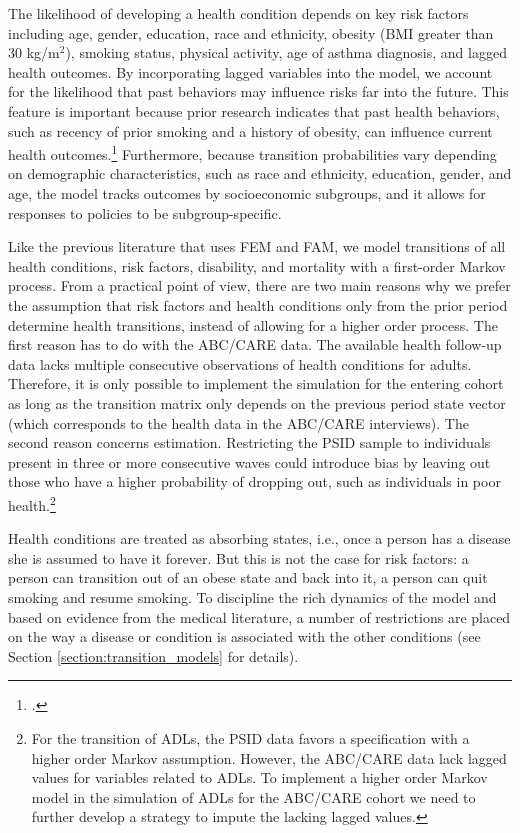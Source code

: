 \noindent The likelihood of developing a health condition depends on key risk factors including age, gender, education, race and ethnicity, obesity (BMI greater than 30 kg/m$^2$), smoking status, physical activity, age of asthma diagnosis, and lagged health outcomes. By incorporating lagged variables into the model, we account for the likelihood that past behaviors may influence risks far into the future. This feature is important because prior research indicates that past health behaviors, such as recency of prior smoking and a history of obesity, can influence current health outcomes.\footnote{\citet{Tong_etal_1996-Lung-Carcinoma,Moore_etal_2008_Past-Body-Mass}.} Furthermore, because transition probabilities vary depending on demographic characteristics, such as race and ethnicity, education, gender, and age, the model tracks outcomes by socioeconomic subgroups, and it allows for responses to policies to be subgroup-specific.

\noindent Like the previous literature that uses FEM and FAM, we model transitions of all health conditions, risk factors, disability, and mortality with a first-order Markov process. From a practical point of view, there are two main reasons why we prefer the assumption that risk factors and health conditions only from the prior period determine health transitions, instead of allowing for a higher order process. The first reason has to do with the ABC/CARE data. The available health follow-up data lacks multiple consecutive observations of health conditions for adults. Therefore, it is only possible to implement the simulation for the entering cohort as long as the transition matrix only depends on the previous period state vector (which corresponds to the health data in the ABC/CARE interviews). The second reason concerns estimation. Restricting the PSID sample to individuals present in three or more consecutive waves could introduce bias by leaving out those who have a higher probability of dropping out, such as individuals in poor health.\footnote{For the transition of ADLs, the PSID data favors a specification with a higher order Markov assumption. However, the ABC/CARE data lack lagged values for variables related to ADLs. To implement a higher order Markov model in the simulation of ADLs for the ABC/CARE cohort we need to further develop a strategy to impute the lacking lagged values.}

\noindent Health conditions are treated as absorbing states, i.e., once a person has a disease she is assumed to have it forever. But this is not the case for risk factors: a person can transition out of an obese state and back into it, a person can quit smoking and resume smoking. To discipline the rich dynamics of the model and based on evidence from the medical literature, a number of restrictions are placed on the way a disease or condition is associated with the other conditions (see Section \ref{section:transition_models} for details).

